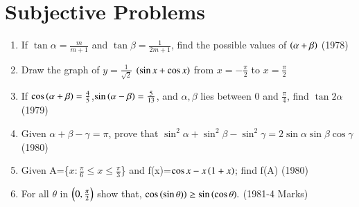 \documentclass[journal,12pt,twocolumn]{IEEEtran}
\theoremstyle{remark}
\begin{document}
\section{Subjective Problems}
\begin{enumerate}
\item If $\tan{\alpha}=\frac{m}{m+1}$ and $\tan{\beta}=\frac{1}{2m+1}$, find the possible values of $\left(\alpha+\beta\right)$ \hfill(1978)
    \item Draw the graph of $y=\frac{1}{\sqrt{2}}$ $\left(\sin {x}+\cos {x}\right)$ from $x=-\frac{\pi}{2}$ to $x=\frac{\pi}{2}$
    \item If $\cos{\ensuremath{\left(\alpha+\beta\right)}}=\frac{4}{5}$,$\sin{\ensuremath{\left(\alpha-\beta\right)}}=\frac{5}{13}$, and $\alpha,\beta$ lies between 0 and $\frac{\pi}{4}$, find $\tan{2\alpha}$ \hfill(1979)
\item Given $\alpha+\beta-\gamma=\pi$, prove that $\sin^2{\alpha}+\sin^2{\beta}-\sin^2{\gamma}=2\sin{\alpha}\sin{\beta}\cos{\gamma}$ \hfill(1980)
\item Given A=\{$x:\frac{\pi}{6}\le x\le\frac{\pi}{3}$\} and f(x)=$\cos{x-x\ensuremath{\left(1+x\right)}}$; find f(A) \hfill(1980)

\item For all $\theta$ in $\left(0, \frac{\pi}{2}\right)$ show that, $\cos{\ensuremath{\left(\sin{\theta)}\right)}}\geq 
\sin{\ensuremath{\left(\cos{\theta}\right)}}.$ \hfill(1981-4 Marks)
\end{enumerate}
\end{document}
